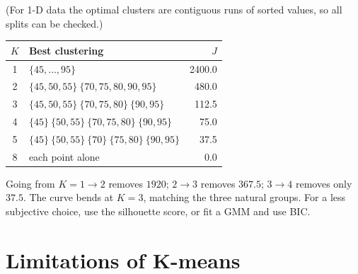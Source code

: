 \documentclass[11pt,a4paper]{article}
\begin{document}
\begin{example}
(For 1-D data the optimal clusters are contiguous runs of sorted values, so all splits can be checked.)
\begin{center}
\begin{tabular}{@{}clr@{}}
\toprule
$K$ & Best clustering & $J$\\
\midrule
1 & $\{45,\dots,95\}$ & 2400.0\\
2 & $\{45,50,55\}\ \{70,75,80,90,95\}$ & 480.0\\
3 & $\{45,50,55\}\ \{70,75,80\}\ \{90,95\}$ & 112.5\\
4 & $\{45\}\ \{50,55\}\ \{70,75,80\}\ \{90,95\}$ & 75.0\\
5 & $\{45\}\ \{50,55\}\ \{70\}\ \{75,80\}\ \{90,95\}$ & 37.5\\
8 & each point alone & 0.0\\
\bottomrule
\end{tabular}
\end{center}
\begin{center}
\end{center}
Going from $K=1\to2$ removes $1920$; $2\to3$ removes $367.5$; $3\to4$ removes only $37.5$. The curve bends at $K=3$, matching the three natural groups. For a less subjective choice, use the silhouette score, or fit a GMM and use BIC.
\end{example}

\section{Limitations of K-means}
\end{document}
